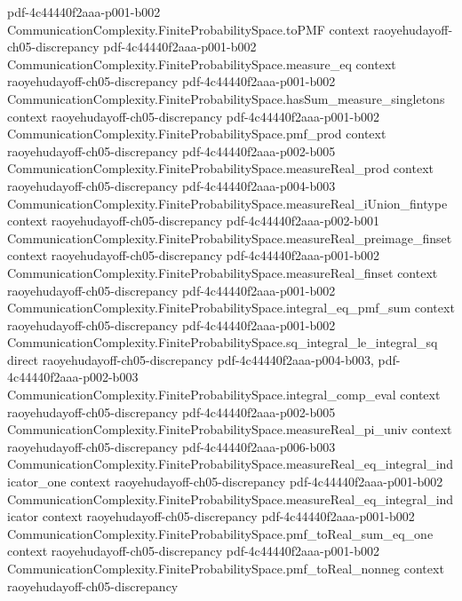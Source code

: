 \begin{theorem}
  {pdf-4c44440f2aaa-p001-b002}
\proofstep
  {CommunicationComplexity.FiniteProbabilitySpace.toPMF}
  {context}
  {raoyehudayoff-ch05-discrepancy}
  {pdf-4c44440f2aaa-p001-b002}
\proofstep
  {CommunicationComplexity.FiniteProbabilitySpace.measure_eq}
  {context}
  {raoyehudayoff-ch05-discrepancy}
  {pdf-4c44440f2aaa-p001-b002}
\proofstep
  {CommunicationComplexity.FiniteProbabilitySpace.hasSum_measure_singletons}
  {context}
  {raoyehudayoff-ch05-discrepancy}
  {pdf-4c44440f2aaa-p001-b002}
\proofstep
  {CommunicationComplexity.FiniteProbabilitySpace.pmf_prod}
  {context}
  {raoyehudayoff-ch05-discrepancy}
  {pdf-4c44440f2aaa-p002-b005}
\proofstep
  {CommunicationComplexity.FiniteProbabilitySpace.measureReal_prod}
  {context}
  {raoyehudayoff-ch05-discrepancy}
  {pdf-4c44440f2aaa-p004-b003}
\proofstep
  {CommunicationComplexity.FiniteProbabilitySpace.measureReal_iUnion_fintype}
  {context}
  {raoyehudayoff-ch05-discrepancy}
  {pdf-4c44440f2aaa-p002-b001}
\proofstep
  {CommunicationComplexity.FiniteProbabilitySpace.measureReal_preimage_finset}
  {context}
  {raoyehudayoff-ch05-discrepancy}
  {pdf-4c44440f2aaa-p001-b002}
\proofstep
  {CommunicationComplexity.FiniteProbabilitySpace.measureReal_finset}
  {context}
  {raoyehudayoff-ch05-discrepancy}
  {pdf-4c44440f2aaa-p001-b002}
\proofstep
  {CommunicationComplexity.FiniteProbabilitySpace.integral_eq_pmf_sum}
  {context}
  {raoyehudayoff-ch05-discrepancy}
  {pdf-4c44440f2aaa-p001-b002}
\proofstep
  {CommunicationComplexity.FiniteProbabilitySpace.sq_integral_le_integral_sq}
  {direct}
  {raoyehudayoff-ch05-discrepancy}
  {pdf-4c44440f2aaa-p004-b003,
    pdf-4c44440f2aaa-p002-b003}
\proofstep
  {CommunicationComplexity.FiniteProbabilitySpace.integral_comp_eval}
  {context}
  {raoyehudayoff-ch05-discrepancy}
  {pdf-4c44440f2aaa-p002-b005}
\proofstep
  {CommunicationComplexity.FiniteProbabilitySpace.measureReal_pi_univ}
  {context}
  {raoyehudayoff-ch05-discrepancy}
  {pdf-4c44440f2aaa-p006-b003}
\proofstep
  {CommunicationComplexity.FiniteProbabilitySpace.measureReal_eq_integral_indicator_one}
  {context}
  {raoyehudayoff-ch05-discrepancy}
  {pdf-4c44440f2aaa-p001-b002}
\proofstep
  {CommunicationComplexity.FiniteProbabilitySpace.measureReal_eq_integral_indicator}
  {context}
  {raoyehudayoff-ch05-discrepancy}
  {pdf-4c44440f2aaa-p001-b002}
\proofstep
  {CommunicationComplexity.FiniteProbabilitySpace.pmf_toReal_sum_eq_one}
  {context}
  {raoyehudayoff-ch05-discrepancy}
  {pdf-4c44440f2aaa-p001-b002}
\proofstep
  {CommunicationComplexity.FiniteProbabilitySpace.pmf_toReal_nonneg}
  {context}
  {raoyehudayoff-ch05-discrepancy}

\end{theorem}
